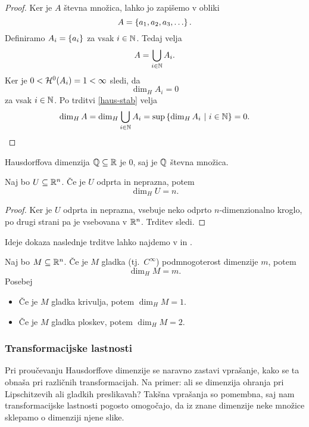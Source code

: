\begin{proof}
    Ker je \(A\) števna množica, lahko jo zapišemo v obliki 
    \[A = \left\{a_1, a_2, a_3, \ldots\right\}.\]
    Definiramo \(A_i = \left\{a_i\right\}\) za vsak \(i \in \mathbb{N}\). Tedaj velja
    \[A = \bigcup_{i \in \mathbb{N}} A_i.\]
    Ker je \(0 < \mathcal{H}^0(A_i) = 1 < \infty\) sledi, da 
    \[\dim_H A_i = 0\]
    za vsak \(i \in \mathbb{N}\).
    Po trditvi \ref{haus-stab} velja
    \[\dim_H A = \dim_H \bigcup_{i \in \mathbb{N}} A_i = \sup \left\{\dim_H A_i \ | \ i \in \mathbb{N}\right\} = 0.\]
\end{proof}

\begin{zgled}
    Hausdorffova dimenzija \(\mathbb{Q} \subseteq \mathbb{R}\) je \(0\), saj je \(\mathbb{Q}\) števna množica. 
\end{zgled}

\begin{trditev}
    \label{haus-odp}
    Naj bo \(U \subseteq \mathbb{R}^n\). Če je \(U\) odprta in neprazna, potem 
    \[\dim_H U = n.\]
\end{trditev}

\begin{proof}
    Ker je \(U\) odprta in neprazna, vsebuje neko odprto \(n\)-dimenzionalno kroglo, po drugi strani pa je vsebovana v \(\mathbb{R}^n\). Trditev sledi.
\end{proof}

Ideje dokaza naslednje trditve lahko najdemo v \cite[stran 32]{fk-fg} in \cite[stran 351]{f-ra}.
\begin{trditev}
    Naj bo \(M \subseteq \mathbb{R}^n\). Če je \(M\) gladka (tj.\ \(C^\infty\)) podmnogoterost dimenzije \(m\), potem 
    \[\dim_H M = m.\]
    Posebej 
    \begin{itemize}
        \item Če je \(M\) gladka krivulja, potem \(\dim_H M = 1.\)
        \item Če je \(M\) gladka ploskev, potem \(\dim_H M = 2.\)
    \end{itemize}
\end{trditev}

\subsubsection{Transformacijske lastnosti}
Pri proučevanju Hausdorffove dimenzije se naravno zastavi vprašanje, kako se ta obnaša pri različnih transformacijah. Na primer: ali se dimenzija ohranja pri Lipschitzevih ali gladkih preslikavah? Takšna vprašanja so pomembna, saj nam transformacijske lastnosti pogosto omogočajo, da iz znane dimenzije neke množice sklepamo o dimenziji njene slike.

